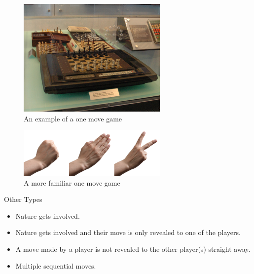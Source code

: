 \documentclass[
  ignorenonframetext,
]{beamer}
\providecommand{\tightlist}{%
  \setlength{\itemsep}{0pt}\setlength{\parskip}{0pt}}
\begin{document}
\begin{frame}
\begin{figure}
\centering
\includegraphics[width=0.65\textwidth,height=0.65\textheight]{images/chess_computer.jpg}
\caption{An example of a one move game}
\end{figure}
\end{frame}

\begin{frame}
\begin{figure}
\centering
\includegraphics[width=0.65\textwidth,height=0.65\textheight]{images/rps.png}
\caption{A more familiar one move game}
\end{figure}
\end{frame}

\begin{frame}{Other Types}
\protect\hypertarget{other-types}{}
\begin{itemize}[<+->]
\tightlist
\item
  Nature gets involved.
\item
  Nature gets involved and their move is only revealed to one of the
  players.
\item
  A move made by a player is not revealed to the other player(s)
  straight away.
\item
  Multiple sequential moves.
\end{itemize}
\end{frame}
\end{document}
